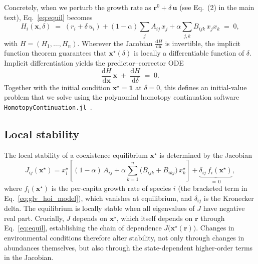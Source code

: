 \documentclass[pdflatex,sn-mathphys-num]{sn-jnl}%
\begin{document}
Concretely, when we perturb the growth rate as $\mathbf{r}^{0}+\delta\,\mathbf{u}$ (see Eq.~(2) in the main text), Eq.~\eqref{eq:equil} becomes
\begin{equation}\label{eq:homotopy}
H_i(\mathbf{x},\delta) \;=\; (r_i + \delta\, u_i) + (1-\alpha)\sum_{j} A_{ij}\,x_j + \alpha\sum_{j,k} B_{ijk}\,x_j x_k \;=\; 0,
\end{equation}
with $H=(H_1,\ldots,H_n)$. Wherever the Jacobian $\frac{\mathrm{d}H}{\mathrm{d}\mathbf{x}}$ is invertible, the implicit function theorem guarantees that $\mathbf{x}^{\star}(\delta)$ is locally a differentiable function of $\delta$. Implicit differentiation yields the predictor--corrector ODE
\begin{equation}\label{eq:ODE}
\frac{\mathrm{d}H}{\mathrm{d}\mathbf{x}}\,\dot{\mathbf{x}} \;+\; \frac{\mathrm{d}H}{\mathrm{d}\delta} \;=\; 0.
\end{equation}
Together with the initial condition $\mathbf{x}^{\star}=\mathbf{1}$ at $\delta=0$, this defines an initial-value problem that we solve using the polynomial homotopy continuation software \texttt{HomotopyContinuation.jl}~\cite{breiding_homotopycontinuationjl_2018,sommese_numerical_2005}.

\subsection{Local stability}\label{sec:stability}

The local stability of a coexistence equilibrium $\mathbf{x}^{\star}$ is determined by the Jacobian
\begin{equation}\label{eq:jacobian}
J_{ij}(\mathbf{x}^{\star}) = x^{\star}_i\!\left[(1-\alpha)\,A_{ij} + \alpha\sum_{k=1}^{n}\bigl(B_{ijk}+B_{ikj}\bigr)\,x^{\star}_k\right] + \underbrace{\delta_{ij}\,f_i(\mathbf{x}^{\star})}_{=\,0},
\end{equation}
where $f_i(\mathbf{x}^{\star})$ is the per-capita growth rate of species $i$ (the bracketed term in Eq.~\ref{eq:glv_hoi_model}), which vanishes at equilibrium, and $\delta_{ij}$ is the Kronecker delta. The equilibrium is locally stable when all eigenvalues of $J$ have negative real part. Crucially, $J$ depends on $\mathbf{x}^{\star}$, which itself depends on $\mathbf{r}$ through Eq.~\eqref{eq:equil}, establishing the chain of dependence $J\bigl(\mathbf{x}^{\star}(\mathbf{r})\bigr)$. Changes in environmental conditions therefore alter stability, not only through changes in abundances themselves, but also through the state-dependent higher-order terms in the Jacobian.
\end{document}
